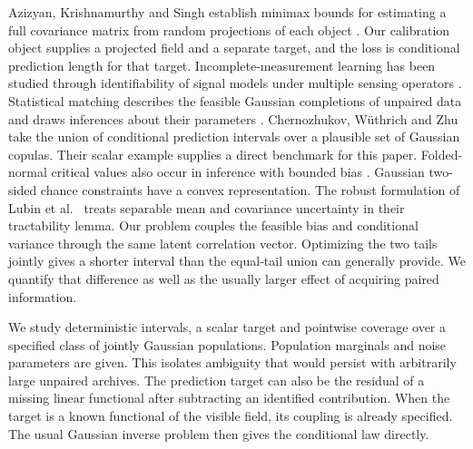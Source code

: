 \documentclass[11pt]{article}
\begin{document}
Azizyan, Krishnamurthy and Singh establish minimax bounds for estimating a full covariance matrix from random projections of each object \cite{compressive}. Our calibration object supplies a projected field and a separate target, and the loss is conditional prediction length for that target. Incomplete-measurement learning has been studied through identifiability of signal models under multiple sensing operators \cite{tachella}. Statistical matching describes the feasible Gaussian completions of unpaired data and draws inferences about their parameters \cite{ahfock}. Chernozhukov, W\"uthrich and Zhu \cite{cwz} take the union of conditional prediction intervals over a plausible set of Gaussian copulas. Their scalar example supplies a direct benchmark for this paper. Folded-normal critical values also occur in inference with bounded bias \cite{ak}. Gaussian two-sided chance constraints have a convex representation. The robust formulation of Lubin et al.\ \cite{lubin} treats separable mean and covariance uncertainty in their tractability lemma. Our problem couples the feasible bias and conditional variance through the same latent correlation vector. Optimizing the two tails jointly gives a shorter interval than the equal-tail union can generally provide. We quantify that difference as well as the usually larger effect of acquiring paired information.

We study deterministic intervals, a scalar target and pointwise coverage over a specified class of jointly Gaussian populations. Population marginals and noise parameters are given. This isolates ambiguity that would persist with arbitrarily large unpaired archives. The prediction target can also be the residual of a missing linear functional after subtracting an identified contribution. When the target is a known functional of the visible field, its coupling is already specified. The usual Gaussian inverse problem then gives the conditional law directly.
\end{document}
